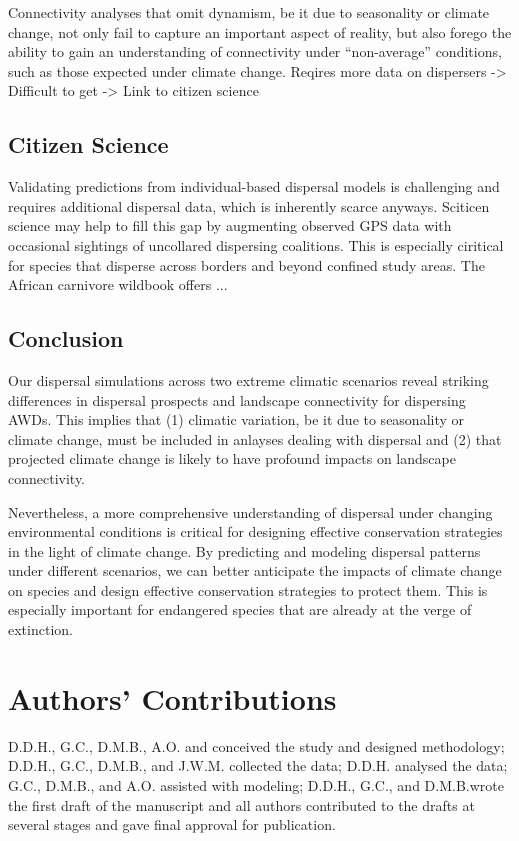 \documentclass[abstract=on,10pt,a4paper,bibliography=totocnumbered]{article}
\begin{document}
Connectivity analyses that omit dynamism, be it due to seasonality or climate
change, not only fail to capture an important aspect of reality, but also forego
the ability to gain an understanding of connectivity under ``non-average''
conditions, such as those expected under climate change. Reqires more data on
dispersers -> Difficult to get -> Link to citizen science

\subsection{Citizen Science}
Validating predictions from individual-based dispersal models is challenging and
requires additional dispersal data, which is inherently scarce anyways. Sciticen
science may help to fill this gap by augmenting observed GPS data with
occasional sightings of uncollared dispersing coalitions. This is especially
ciritical for species that disperse across borders and beyond confined study
areas. The African carnivore wildbook offers ...

\subsection{Conclusion}
Our dispersal simulations across two extreme climatic scenarios reveal striking
differences in dispersal prospects and landscape connectivity for dispersing
AWDs. This implies that (1) climatic variation, be it due to seasonality or
climate change, must be included in anlayses dealing with dispersal and (2) that
projected climate change is likely to have profound impacts on landscape
connectivity.

Nevertheless, a more comprehensive understanding of dispersal under
changing environmental conditions is critical for designing effective
conservation strategies in the light of climate change. By predicting and
modeling dispersal patterns under different scenarios, we can better anticipate
the impacts of climate change on species and design effective conservation
strategies to protect them. This is especially important for endangered species
that are already at the verge of extinction.

\section{Authors' Contributions}
D.D.H., G.C., D.M.B., A.O. and conceived the study and designed methodology;
D.D.H., G.C., D.M.B., and J.W.M. collected the data; D.D.H. analysed the data;
G.C., D.M.B., and A.O. assisted with modeling; D.D.H., G.C., and D.M.B.wrote the
first draft of the manuscript and all authors contributed to the drafts at
several stages and gave final approval for publication.
\end{document}

